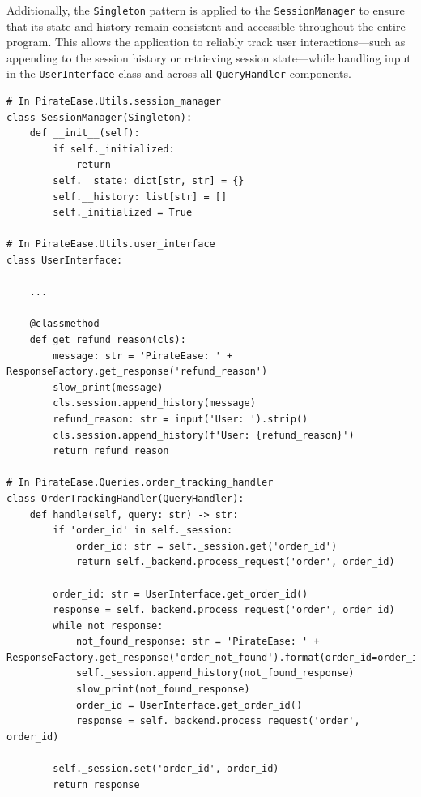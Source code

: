 \documentclass[11pt]{article}
\begin{document}
%
Additionally, the \texttt{Singleton} pattern is applied to the \texttt{SessionManager} to ensure that its state and history remain consistent and accessible throughout the entire program. This allows the application to reliably track user interactions—such as appending to the session history or retrieving session state—while handling input in the \texttt{UserInterface} class and across all \texttt{QueryHandler} components.
%
\begin{lstlisting}
# In PirateEase.Utils.session_manager
class SessionManager(Singleton):
    def __init__(self):
        if self._initialized:
            return
        self.__state: dict[str, str] = {}
        self.__history: list[str] = []
        self._initialized = True
        
# In PirateEase.Utils.user_interface
class UserInterface:
	
	...	
	
    @classmethod
    def get_refund_reason(cls):
        message: str = 'PirateEase: ' + ResponseFactory.get_response('refund_reason')
        slow_print(message)
        cls.session.append_history(message)
        refund_reason: str = input('User: ').strip()
        cls.session.append_history(f'User: {refund_reason}')
        return refund_reason
        
# In PirateEase.Queries.order_tracking_handler
class OrderTrackingHandler(QueryHandler):
    def handle(self, query: str) -> str:
        if 'order_id' in self._session:
            order_id: str = self._session.get('order_id')
            return self._backend.process_request('order', order_id)

        order_id: str = UserInterface.get_order_id()
        response = self._backend.process_request('order', order_id)
        while not response:
            not_found_response: str = 'PirateEase: ' + ResponseFactory.get_response('order_not_found').format(order_id=order_id)
            self._session.append_history(not_found_response)
            slow_print(not_found_response)
            order_id = UserInterface.get_order_id()
            response = self._backend.process_request('order', order_id)

        self._session.set('order_id', order_id)
        return response
\end{lstlisting}
%
%
%
\end{document}
